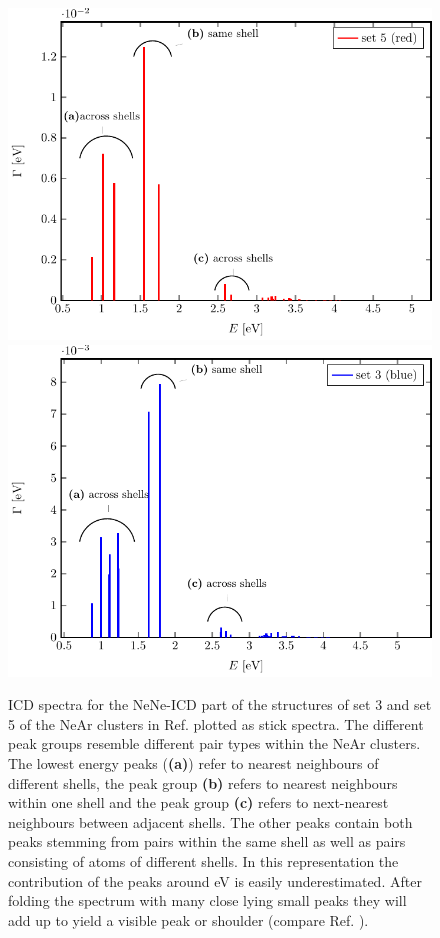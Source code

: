 \begin{figure}[h]
 \centering
 \includegraphics[width=0.7\columnwidth]{rot.pdf}\\
 \includegraphics[width=0.7\columnwidth]{blue.pdf}
 \caption{ICD spectra for the NeNe-ICD part of the structures of set 3 and
          set 5 of the NeAr clusters in Ref. \cite{Fasshauer14_1}
          plotted as stick spectra.
          The different peak groups resemble different pair types
          within the NeAr clusters. The lowest energy peaks (\textbf{(a)})
          refer to nearest neighbours
          of different shells, the peak group \textbf{(b)} refers
          to nearest neighbours within one shell and the peak group \textbf{(c)}
          refers to next-nearest neighbours between adjacent shells.
          The other peaks contain both peaks stemming from
          pairs within the same shell as well as pairs consisting of atoms
          of different shells. In this representation the contribution of the
          peaks around \unit[3]{eV} is easily underestimated. After folding the
          spectrum with many close lying small peaks they will add up to yield
          a visible peak or shoulder (compare Ref. \cite{Fasshauer14_1}).}
 \label{figure:rot_blue}
\end{figure}

